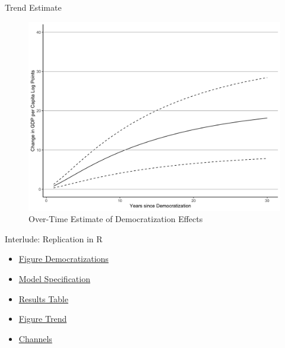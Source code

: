 \documentclass[
  ignorenonframetext,
]{beamer}
\providecommand{\tightlist}{%
  \setlength{\itemsep}{0pt}\setlength{\parskip}{0pt}}\usepackage{longtable,booktabs,array}
\begin{document}
\begin{frame}{Trend Estimate}
\protect\hypertarget{trend-estimate}{}
\begin{figure}

{\centering \includegraphics{output/FigureTrend.png}

}

\caption{Over-Time Estimate of Democratization Effects}

\end{figure}
\end{frame}

\begin{frame}{Interlude: Replication in R}
\protect\hypertarget{interlude-replication-in-r}{}
\begin{itemize}
\tightlist
\item
  \href{https://skriptum.github.io/DDCG/vortrag/5-FigureDem.html}{Figure
  Democratizations}
\item
  \href{https://skriptum.github.io/DDCG/vortrag/2-Panel-Models.html}{Model
  Specification}
\item
  \href{https://skriptum.github.io/DDCG/vortrag/3-Table2.html}{Results
  Table}
\item
  \href{https://skriptum.github.io/DDCG/vortrag/4-Figure2.html\#plot}{Figure
  Trend}
\item
  \href{https://skriptum.github.io/DDCG/vortrag/7-Channels.Models.html}{Channels}
\end{itemize}
\end{frame}
\end{document}
